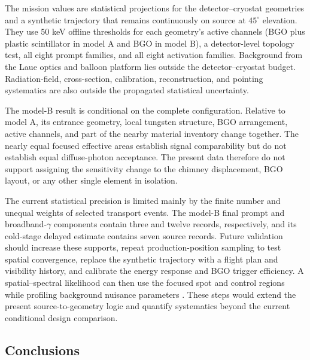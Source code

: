\documentclass[11pt]{article}
\begin{document}
The mission values are statistical projections for the detector--cryostat
geometries and a synthetic trajectory that remains continuously on source at
$45^\circ$ elevation. They use 50 keV offline thresholds for each geometry's
active channels (BGO plus plastic scintillator in model A and BGO in model B),
a detector-level topology test, all eight prompt families, and all eight
activation families. Background from the Laue optics and balloon platform lies
outside the detector--cryostat budget. Radiation-field, cross-section,
calibration, reconstruction, and pointing systematics are also outside the
propagated statistical uncertainty.

The model-B result is conditional on the complete configuration. Relative to
model A, its entrance geometry, local tungsten structure, BGO arrangement,
active channels, and part of the nearby material inventory change together.
The nearly equal focused effective areas establish signal comparability but do
not establish equal diffuse-photon acceptance. The present data therefore do
not support assigning the sensitivity change to the chimney displacement, BGO
layout, or any other single element in isolation.

The current statistical precision is limited mainly by the finite number and
unequal weights of selected transport events. The model-B final prompt and
broadband-$\gamma$ components contain three and twelve records, respectively,
and its cold-stage delayed estimate contains seven source records. Future
validation should increase these supports, repeat production-position sampling
to test spatial convergence, replace the synthetic trajectory with a flight
plan and visibility history, and calibrate the energy response and BGO trigger
efficiency. A spatial--spectral likelihood can then use the focused spot and
control regions while profiling background nuisance parameters
\cite{Cowan2011}. These steps would extend the present source-to-geometry logic
and quantify systematics beyond the current conditional design comparison.

\subsection{Conclusions}
\label{sec:conclusions}
\end{document}
